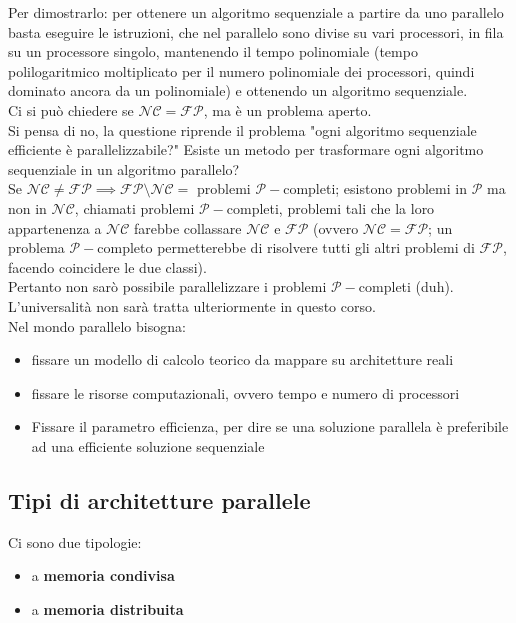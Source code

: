 Per dimostrarlo: per ottenere un algoritmo sequenziale a partire da uno parallelo basta eseguire le istruzioni, che nel parallelo sono divise su vari processori, in fila su un processore singolo, mantenendo il tempo polinomiale (tempo polilogaritmico moltiplicato per il numero polinomiale dei processori, quindi dominato ancora da un polinomiale) e ottenendo un algoritmo sequenziale.\\

Ci si può chiedere se $\mathcal{NC} = \mathcal{FP}$, ma è un problema aperto.\\
Si pensa di no, la questione riprende il problema "ogni algoritmo sequenziale efficiente è parallelizzabile?" Esiste un metodo per trasformare ogni algoritmo sequenziale in un algoritmo parallelo?\\

Se $\mathcal{NC} \neq \mathcal{FP} \implies \mathcal{FP} \setminus \mathcal{NC} = $ problemi $\mathcal{P}-$completi; esistono problemi in $\mathcal{P}$ ma non in $\mathcal{NC}$, chiamati problemi $\mathcal{P}-$completi, problemi tali che la loro appartenenza a $\mathcal{NC}$ farebbe collassare $\mathcal{NC}$ e $\mathcal{FP}$ (ovvero $\mathcal{NC} = \mathcal{FP}$; un problema $\mathcal{P}-$completo permetterebbe di risolvere tutti gli altri problemi di $\mathcal{FP}$, facendo coincidere le due classi).\\

Pertanto non sarò possibile parallelizzare i problemi $\mathcal{P}-$completi (duh).\\
L'universalità non sarà tratta ulteriormente in questo corso.\\


Nel mondo parallelo bisogna: 
\begin{itemize}
	\item fissare un modello di calcolo teorico da mappare su architetture reali
	\item fissare le risorse computazionali, ovvero tempo e numero di processori 
	\item Fissare il parametro efficienza, per dire se una soluzione parallela è preferibile ad una efficiente soluzione sequenziale 
\end{itemize}

\newpage

\subsection{Tipi di architetture parallele}
Ci sono due tipologie:
\begin{itemize}
	\item a \textbf{memoria condivisa}
	\item a \textbf{memoria distribuita}
\end{itemize}

